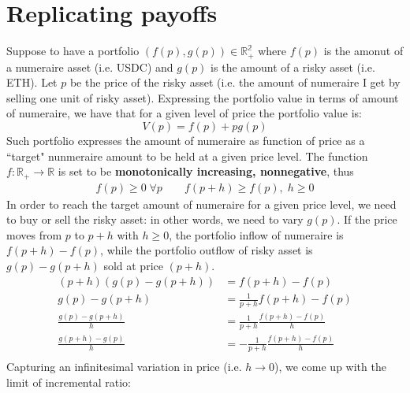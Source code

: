 \documentclass[12pt]{article}
\begin{document}
\section{Replicating payoffs}
Suppose to have a portfolio $(f(p),g(p))\in \mathbb{R^\text{2}_+}$ where $f(p)$ is the amonut of a numeraire asset (i.e. USDC) and $g(p)$ is the amount of a risky asset (i.e. ETH).\newline
Let $p$ be the price of the risky asset (i.e. the amount of numeraire I get by selling one unit of risky asset).\newline
Expressing the portfolio value in terms of amount of numeraire, we have that for a given level of price the portfolio value is:
\begin{equation}
    V(p) = f(p) + pg(p)
\end{equation}
Such portfolio expresses the amount of numeraire as function of price as a ``target" nunmeraire amount to be held at a given price level.
\newline
The function $f:\mathbb{R_+}\rightarrow\mathbb{R}$ is set to be \textbf{monotonically increasing, nonnegative}, thus
\begin{align*}
    f(p)\geq 0 \;\forall p \qquad f(p+h)\geq f(p), \; h\geq 0
\end{align*}
In order to reach the target amount of numeraire for a given price level, we need to buy or sell the risky asset: in other words, we need to vary $g(p)$.
\newline
If the price moves from $p$ to $p+h$ with $h\geq 0$, the portfolio inflow of numeraire is \newline $f(p+h)-f(p)$, while the portfolio outflow of risky asset is $g(p)-g(p+h)$ sold at price $(p+h)$.
\begin{align*}
    (p+h)(g(p) - g(p+h))    & = f(p+h)-f(p)                         \\
    g(p) - g(p+h)           & = \frac{1}{p+h}f(p+h)-f(p)            \\
    \frac{g(p) - g(p+h)}{h} & = \frac{1}{p+h}\frac{f(p+h)-f(p)}{h}  \\
    \frac{g(p+h) - g(p)}{h} & = -\frac{1}{p+h}\frac{f(p+h)-f(p)}{h} \\
\end{align*}
Capturing an infinitesimal variation in price (i.e. $h\rightarrow 0$), we come up with the limit of incremental ratio:
\end{document}
